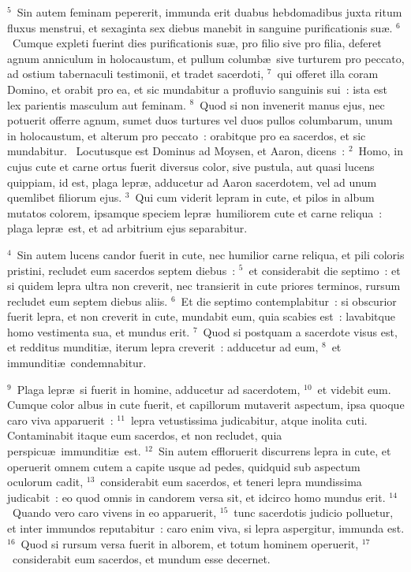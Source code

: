 ${}^{5}$~Sin autem feminam pepererit, immunda erit duabus hebdomadibus juxta ritum fluxus menstrui, et sexaginta sex diebus manebit in sanguine purificationis su\ae .
${}^{6}$~Cumque expleti fuerint dies purificationis su\ae , pro filio sive pro filia, deferet agnum anniculum in holocaustum, et pullum columb\ae\ sive turturem pro peccato, ad ostium tabernaculi testimonii, et tradet sacerdoti,
${}^{7}$~qui offeret illa coram Domino, et orabit pro ea, et sic mundabitur a profluvio sanguinis sui~: ista est lex parientis masculum aut feminam.
${}^{8}$~Quod si non invenerit manus ejus, nec potuerit offerre agnum, sumet duos turtures vel duos pullos columbarum, unum in holocaustum, et alterum pro peccato~: orabitque pro ea sacerdos, et sic mundabitur.
~\lettrine[lines=10,image=true,loversize=0.05,lraise=-0.03]{L}{}ocutusque est Dominus ad Moysen, et Aaron, dicens~:
${}^{2}$~Homo, in cujus cute et carne ortus fuerit diversus color, sive pustula, aut quasi lucens quippiam, id est, plaga lepr\ae , adducetur ad Aaron sacerdotem, vel ad unum quemlibet filiorum ejus.
${}^{3}$~Qui cum viderit lepram in cute, et pilos in album mutatos colorem, ipsamque speciem lepr\ae\ humiliorem cute et carne reliqua~: plaga lepr\ae\ est, et ad arbitrium ejus separabitur.


${}^{4}$~Sin autem lucens candor fuerit in cute, nec humilior carne reliqua, et pili coloris pristini, recludet eum sacerdos septem diebus~:
${}^{5}$~et considerabit die septimo~: et si quidem lepra ultra non creverit, nec transierit in cute priores terminos, rursum recludet eum septem diebus aliis.
${}^{6}$~Et die septimo contemplabitur~: si obscurior fuerit lepra, et non creverit in cute, mundabit eum, quia scabies est~: lavabitque homo vestimenta sua, et mundus erit.
${}^{7}$~Quod si postquam a sacerdote visus est, et redditus munditi\ae , iterum lepra creverit~: adducetur ad eum,
${}^{8}$~et immunditi\ae\ condemnabitur.


${}^{9}$~Plaga lepr\ae\ si fuerit in homine, adducetur ad sacerdotem,
${}^{10}$~et videbit eum. Cumque color albus in cute fuerit, et capillorum mutaverit aspectum, ipsa quoque caro viva apparuerit~:
${}^{11}$~lepra vetustissima judicabitur, atque inolita cuti. Contaminabit itaque eum sacerdos, et non recludet, quia perspicu\ae\ immunditi\ae\ est.
${}^{12}$~Sin autem effloruerit discurrens lepra in cute, et operuerit omnem cutem a capite usque ad pedes, quidquid sub aspectum oculorum cadit,
${}^{13}$~considerabit eum sacerdos, et teneri lepra mundissima judicabit~: eo quod omnis in candorem versa sit, et idcirco homo mundus erit.
${}^{14}$~Quando vero caro vivens in eo apparuerit,
${}^{15}$~tunc sacerdotis judicio polluetur, et inter immundos reputabitur~: caro enim viva, si lepra aspergitur, immunda est.
${}^{16}$~Quod si rursum versa fuerit in alborem, et totum hominem operuerit,
${}^{17}$~considerabit eum sacerdos, et mundum esse decernet.


